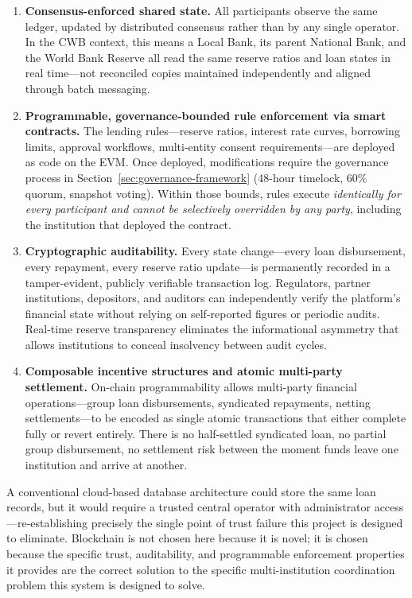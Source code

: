 \documentclass[12pt,a4paper]{report}
\begin{document}
\begin{enumerate}[noitemsep]
\item \textbf{Consensus-enforced shared state.} All participants observe the same ledger, updated by distributed consensus rather than by any single operator. In the CWB context, this means a Local Bank, its parent National Bank, and the World Bank Reserve all read the same reserve ratios and loan states in real time---not reconciled copies maintained independently and aligned through batch messaging.

\item \textbf{Programmable, governance-bounded rule enforcement via smart contracts.} The lending rules---reserve ratios, interest rate curves, borrowing limits, approval workflows, multi-entity consent requirements---are deployed as code on the EVM. Once deployed, modifications require the governance process in Section~\ref{sec:governance-framework} (48-hour timelock, 60\% quorum, snapshot voting). Within those bounds, rules execute \textit{identically for every participant and cannot be selectively overridden by any party}, including the institution that deployed the contract.

\item \textbf{Cryptographic auditability.} Every state change---every loan disbursement, every repayment, every reserve ratio update---is permanently recorded in a tamper-evident, publicly verifiable transaction log. Regulators, partner institutions, depositors, and auditors can independently verify the platform's financial state without relying on self-reported figures or periodic audits. Real-time reserve transparency eliminates the informational asymmetry that allows institutions to conceal insolvency between audit cycles.

\item \textbf{Composable incentive structures and atomic multi-party settlement.} On-chain programmability allows multi-party financial operations---group loan disbursements, syndicated repayments, netting settlements---to be encoded as single atomic transactions that either complete fully or revert entirely. There is no half-settled syndicated loan, no partial group disbursement, no settlement risk between the moment funds leave one institution and arrive at another.
\end{enumerate}

A conventional cloud-based database architecture could store the same loan records, but it would require a trusted central operator with administrator access---re-establishing precisely the single point of trust failure this project is designed to eliminate. Blockchain is not chosen here because it is novel; it is chosen because the specific trust, auditability, and programmable enforcement properties it provides are the correct solution to the specific multi-institution coordination problem this system is designed to solve.
\end{document}
